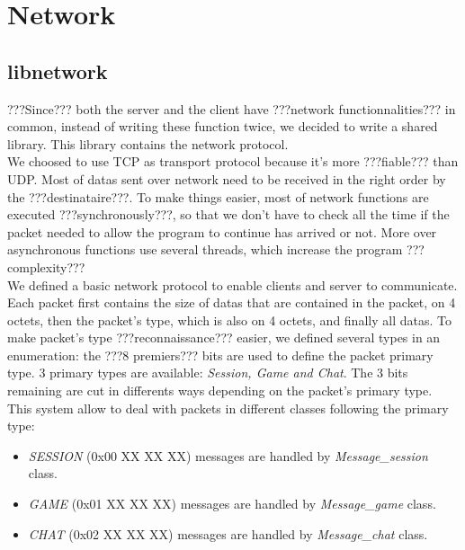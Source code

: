 \documentclass{scrreprt}
\begin{document}
	\section{Network}
	\subsection{libnetwork}
	???Since??? both the server and the client have ???network functionnalities??? in common, instead of writing these function twice, we decided to write a shared library. This library contains the network protocol.\\

		We choosed to use TCP as transport protocol because it's more ???fiable??? than UDP. Most of datas sent over network need to be received in the right order by the ???destinataire???. To make things easier, most of network functions are executed ???synchronously???, so that we don't have to check all the time if the packet needed to allow the program to continue has arrived or not. More over asynchronous functions use several threads, which increase the program ???complexity???\\

		We defined a basic network protocol to enable clients and server to communicate. Each packet first contains the size of datas that are contained in the packet, on 4 octets, then the packet's type, which is also on 4 octets, and finally all datas. To make packet's type ???reconnaissance??? easier, we defined several types in an enumeration: the ???8 premiers??? bits are used to define the packet primary type. 3 primary types are available: \emph{Session, Game and Chat}. The 3 bits remaining are cut in differents ways depending on the packet's primary type. This system allow to deal with packets in different classes following the primary type:
		\begin{itemize}
		\item{\emph{SESSION} (0x00 XX XX XX) messages are handled by \emph{Message\_session} class.}
		\item{\emph{GAME} (0x01 XX XX XX) messages are handled by \emph{Message\_game} class.}
		\item{\emph{CHAT} (0x02 XX XX XX) messages are handled by \emph{Message\_chat} class.}
		\end{itemize}

\end{document}
